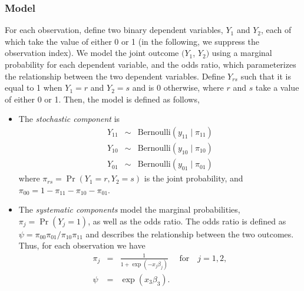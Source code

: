 \subsubsection{Model}

For each observation, define two binary dependent variables, $Y_1$ and
$Y_2$, each of which take the value of either 0 or 1 (in the
following, we suppress the observation index).  We model the joint
outcome $(Y_1$, $Y_2)$ using a marginal probability for each dependent
variable, and the odds ratio, which parameterizes the relationship
between the two dependent variables. Define $Y_{rs}$ such that it is
equal to 1 when $Y_1=r$ and $Y_2=s$ and is 0 otherwise, where $r$ and
$s$ take a value of either 0 or 1. Then, the model is defined as follows,

\begin{itemize}
 
\item The \emph{stochastic component} is
\begin{eqnarray*}
  Y_{11} &\sim& \textrm{Bernoulli}(y_{11} \mid \pi_{11}) \\
  Y_{10} &\sim& \textrm{Bernoulli}(y_{10} \mid \pi_{10}) \\
  Y_{01} &\sim& \textrm{Bernoulli}(y_{01} \mid \pi_{01})
\end{eqnarray*}
where $\pi_{rs}=\Pr(Y_1=r, Y_2=s)$ is the joint probability, and
$\pi_{00}=1-\pi_{11}-\pi_{10}-\pi_{01}$.


\item The \emph{systematic components} model the marginal probabilities,
  $\pi_j=\Pr(Y_j=1)$, as well as the odds ratio.  The odds ratio
  is defined as $\psi = \pi_{00} \pi_{01}/\pi_{10}\pi_{11}$ and
  describes the relationship between the two outcomes.  Thus, for each
  observation we have
\begin{eqnarray*}
\pi_j & = & \frac{1}{1 + \exp(-x_j \beta_j)} \quad \textrm{ for} \quad
j=1,2, \\
\psi &= & \exp(x_3 \beta_3).
\end{eqnarray*}

\end{itemize}


